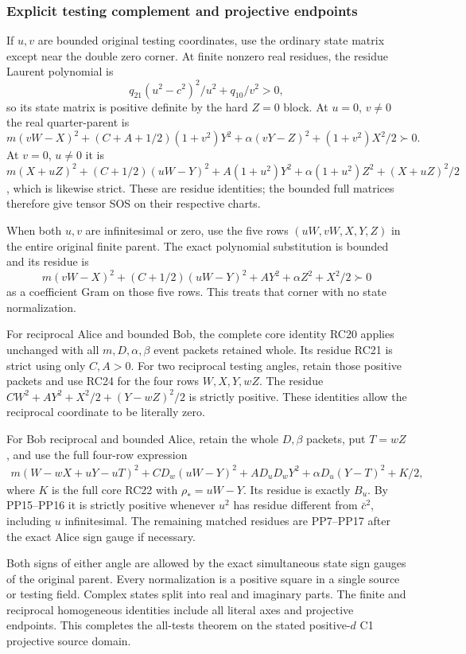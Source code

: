 \subsubsection*{Explicit testing complement and projective endpoints}

If $u,v$ are bounded original testing coordinates, use the ordinary
state matrix except near the double zero corner. At finite nonzero
real residues, the residue Laurent polynomial is
\[
 q_{21}(u^2-c^2)^2/u^2+q_{10}/v^2>0,
 \tag{PP18}
\]
so its state matrix is positive definite by the hard $Z=0$ block.
At $u=0$, $v\ne0$ the real quarter-parent is
\[
 m(vW-X)^2+(C+A+1/2)(1+v^2)Y^2
                       +\alpha(vY-Z)^2+(1+v^2)X^2/2\succ0.
\]
At $v=0$, $u\ne0$ it is
$m(X+uZ)^2+(C+1/2)(uW-Y)^2+A(1+u^2)Y^2
+\alpha(1+u^2)Z^2+(X+uZ)^2/2$, which is likewise strict.
These are residue identities; the bounded full matrices therefore
give tensor SOS on their respective charts.

When both $u,v$ are infinitesimal or zero, use the five rows
$(uW,vW,X,Y,Z)$ in the entire original finite parent. The exact
polynomial substitution is bounded and its residue is
\[
 m(vW-X)^2+(C+1/2)(uW-Y)^2+AY^2+\alpha Z^2+X^2/2\succ0
 \tag{PP19}
\]
as a coefficient Gram on those five rows. This treats that corner
with no state normalization.

For reciprocal Alice and bounded Bob, the complete core identity
RC20 applies unchanged with all $m,D,\alpha,\beta$ event packets
retained whole. Its residue RC21 is strict using only $C,A>0$.
For two reciprocal testing angles, retain those positive packets
and use RC24 for the four rows $W,X,Y,wZ$. The residue
$CW^2+AY^2+X^2/2+(Y-wZ)^2/2$ is strictly positive.
These identities allow the reciprocal coordinate to be literally zero.

For Bob reciprocal and bounded Alice, retain the whole $D,\beta$
packets, put $T=wZ$, and use the full four-row expression
\[
\begin{split}
 m(W-wX+uY-uT)^2+CD_w(uW-Y)^2
          +AD_uD_wY^2+\alpha D_u(Y-T)^2+K/2,
\end{split}
\]
where $K$ is the full core RC22 with $\rho_*=uW-Y$.
Its residue is exactly $B_u$. By PP15--PP16 it is strictly
positive whenever $u^2$ has residue different from $\bar c^2$,
including $u$ infinitesimal. The remaining matched residues are
PP7--PP17 after the exact Alice sign gauge if necessary.

Both signs of either angle are allowed by the exact simultaneous
state sign gauges of the original parent. Every normalization is
a positive square in a single source or testing field. Complex
states split into real and imaginary parts. The finite and
reciprocal homogeneous identities include all literal axes and
projective endpoints. This completes the all-tests theorem on the
stated positive-$d$ C1 projective source domain.



